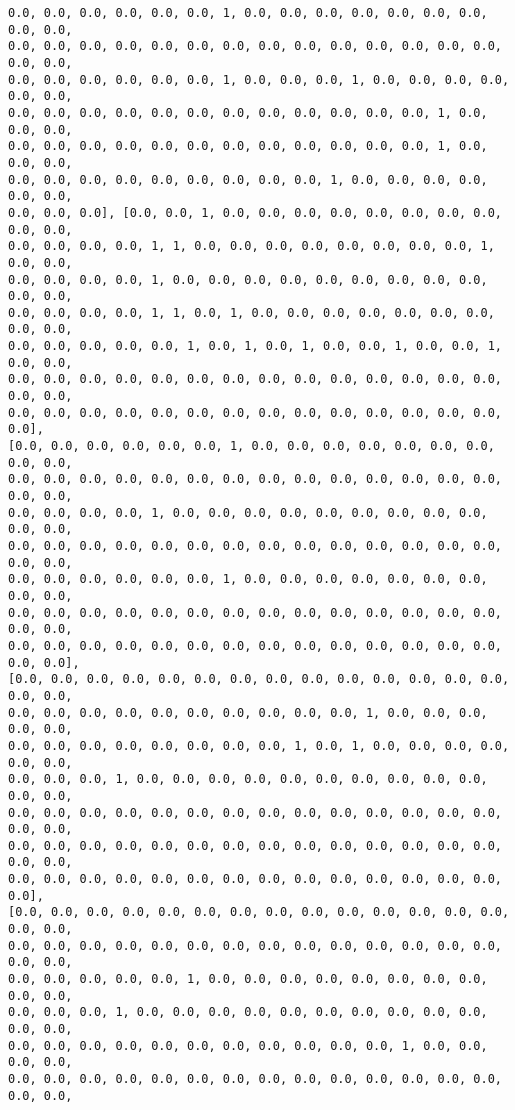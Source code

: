 \documentclass[11pt]{article}
\begin{document}
\begin{Verbatim}[commandchars=\\\{\}]
0.0, 0.0, 0.0, 0.0, 0.0, 0.0, 1, 0.0, 0.0, 0.0, 0.0, 0.0, 0.0, 0.0, 0.0, 0.0,
0.0, 0.0, 0.0, 0.0, 0.0, 0.0, 0.0, 0.0, 0.0, 0.0, 0.0, 0.0, 0.0, 0.0, 0.0, 0.0,
0.0, 0.0, 0.0, 0.0, 0.0, 0.0, 1, 0.0, 0.0, 0.0, 1, 0.0, 0.0, 0.0, 0.0, 0.0, 0.0,
0.0, 0.0, 0.0, 0.0, 0.0, 0.0, 0.0, 0.0, 0.0, 0.0, 0.0, 0.0, 1, 0.0, 0.0, 0.0,
0.0, 0.0, 0.0, 0.0, 0.0, 0.0, 0.0, 0.0, 0.0, 0.0, 0.0, 0.0, 1, 0.0, 0.0, 0.0,
0.0, 0.0, 0.0, 0.0, 0.0, 0.0, 0.0, 0.0, 0.0, 1, 0.0, 0.0, 0.0, 0.0, 0.0, 0.0,
0.0, 0.0, 0.0], [0.0, 0.0, 1, 0.0, 0.0, 0.0, 0.0, 0.0, 0.0, 0.0, 0.0, 0.0, 0.0,
0.0, 0.0, 0.0, 0.0, 1, 1, 0.0, 0.0, 0.0, 0.0, 0.0, 0.0, 0.0, 0.0, 1, 0.0, 0.0,
0.0, 0.0, 0.0, 0.0, 1, 0.0, 0.0, 0.0, 0.0, 0.0, 0.0, 0.0, 0.0, 0.0, 0.0, 0.0,
0.0, 0.0, 0.0, 0.0, 1, 1, 0.0, 1, 0.0, 0.0, 0.0, 0.0, 0.0, 0.0, 0.0, 0.0, 0.0,
0.0, 0.0, 0.0, 0.0, 0.0, 1, 0.0, 1, 0.0, 1, 0.0, 0.0, 1, 0.0, 0.0, 1, 0.0, 0.0,
0.0, 0.0, 0.0, 0.0, 0.0, 0.0, 0.0, 0.0, 0.0, 0.0, 0.0, 0.0, 0.0, 0.0, 0.0, 0.0,
0.0, 0.0, 0.0, 0.0, 0.0, 0.0, 0.0, 0.0, 0.0, 0.0, 0.0, 0.0, 0.0, 0.0, 0.0],
[0.0, 0.0, 0.0, 0.0, 0.0, 0.0, 1, 0.0, 0.0, 0.0, 0.0, 0.0, 0.0, 0.0, 0.0, 0.0,
0.0, 0.0, 0.0, 0.0, 0.0, 0.0, 0.0, 0.0, 0.0, 0.0, 0.0, 0.0, 0.0, 0.0, 0.0, 0.0,
0.0, 0.0, 0.0, 0.0, 1, 0.0, 0.0, 0.0, 0.0, 0.0, 0.0, 0.0, 0.0, 0.0, 0.0, 0.0,
0.0, 0.0, 0.0, 0.0, 0.0, 0.0, 0.0, 0.0, 0.0, 0.0, 0.0, 0.0, 0.0, 0.0, 0.0, 0.0,
0.0, 0.0, 0.0, 0.0, 0.0, 0.0, 1, 0.0, 0.0, 0.0, 0.0, 0.0, 0.0, 0.0, 0.0, 0.0,
0.0, 0.0, 0.0, 0.0, 0.0, 0.0, 0.0, 0.0, 0.0, 0.0, 0.0, 0.0, 0.0, 0.0, 0.0, 0.0,
0.0, 0.0, 0.0, 0.0, 0.0, 0.0, 0.0, 0.0, 0.0, 0.0, 0.0, 0.0, 0.0, 0.0, 0.0, 0.0],
[0.0, 0.0, 0.0, 0.0, 0.0, 0.0, 0.0, 0.0, 0.0, 0.0, 0.0, 0.0, 0.0, 0.0, 0.0, 0.0,
0.0, 0.0, 0.0, 0.0, 0.0, 0.0, 0.0, 0.0, 0.0, 0.0, 1, 0.0, 0.0, 0.0, 0.0, 0.0,
0.0, 0.0, 0.0, 0.0, 0.0, 0.0, 0.0, 0.0, 1, 0.0, 1, 0.0, 0.0, 0.0, 0.0, 0.0, 0.0,
0.0, 0.0, 0.0, 1, 0.0, 0.0, 0.0, 0.0, 0.0, 0.0, 0.0, 0.0, 0.0, 0.0, 0.0, 0.0,
0.0, 0.0, 0.0, 0.0, 0.0, 0.0, 0.0, 0.0, 0.0, 0.0, 0.0, 0.0, 0.0, 0.0, 0.0, 0.0,
0.0, 0.0, 0.0, 0.0, 0.0, 0.0, 0.0, 0.0, 0.0, 0.0, 0.0, 0.0, 0.0, 0.0, 0.0, 0.0,
0.0, 0.0, 0.0, 0.0, 0.0, 0.0, 0.0, 0.0, 0.0, 0.0, 0.0, 0.0, 0.0, 0.0, 0.0],
[0.0, 0.0, 0.0, 0.0, 0.0, 0.0, 0.0, 0.0, 0.0, 0.0, 0.0, 0.0, 0.0, 0.0, 0.0, 0.0,
0.0, 0.0, 0.0, 0.0, 0.0, 0.0, 0.0, 0.0, 0.0, 0.0, 0.0, 0.0, 0.0, 0.0, 0.0, 0.0,
0.0, 0.0, 0.0, 0.0, 0.0, 1, 0.0, 0.0, 0.0, 0.0, 0.0, 0.0, 0.0, 0.0, 0.0, 0.0,
0.0, 0.0, 0.0, 1, 0.0, 0.0, 0.0, 0.0, 0.0, 0.0, 0.0, 0.0, 0.0, 0.0, 0.0, 0.0,
0.0, 0.0, 0.0, 0.0, 0.0, 0.0, 0.0, 0.0, 0.0, 0.0, 0.0, 1, 0.0, 0.0, 0.0, 0.0,
0.0, 0.0, 0.0, 0.0, 0.0, 0.0, 0.0, 0.0, 0.0, 0.0, 0.0, 0.0, 0.0, 0.0, 0.0, 0.0,

\end{Verbatim}
\end{document}
